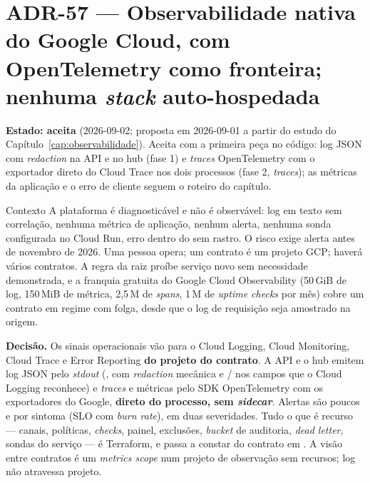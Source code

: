 \section{ADR-57 --- Observabilidade nativa do Google Cloud, com OpenTelemetry
como fronteira; nenhuma \emph{stack} auto-hospedada}
\label{adr:observabilidade-nativa}

\textbf{Estado: aceita} (2026-09-02; proposta em 2026-09-01 a partir do
estudo do Capítulo~\ref{cap:observabilidade}). Aceita com a primeira peça
no código: log JSON com \emph{redaction} na API e no hub (fase 1) e
\emph{traces} OpenTelemetry com o exportador direto do Cloud Trace nos dois
processos (fase 2, \emph{traces}); as métricas da aplicação e o erro de
cliente seguem o roteiro do capítulo.

\begin{especificacao}{Contexto}
A plataforma é diagnosticável e não é observável: log em texto sem
correlação, nenhuma métrica de aplicação, nenhum alerta, nenhuma sonda
configurada no Cloud Run, erro dentro do  sem rastro. O risco
 exige alerta antes de novembro de 2026. Uma pessoa opera; um
contrato é um projeto GCP; haverá vários contratos. A regra da raiz proíbe
serviço novo sem necessidade demonstrada, e a franquia gratuita do Google
Cloud Observability (50\,GiB de log, 150\,MiB de métrica, 2,5\,M de
\emph{spans}, 1\,M de \emph{uptime checks} por mês) cobre um contrato em
regime com folga, desde que o log de requisição seja amostrado na origem.
\end{especificacao}

\textbf{Decisão.} Os sinais operacionais vão para o Cloud Logging, Cloud
Monitoring, Cloud Trace e Error Reporting \textbf{do projeto do contrato}.
A API e o hub emitem log JSON pelo \emph{stdout} (, com
\emph{redaction} mecânica e / nos campos que o Cloud
Logging reconhece) e \emph{traces} e métricas pelo SDK OpenTelemetry com os
exportadores do Google, \textbf{direto do processo, sem \emph{sidecar}}.
Alertas são poucos e por sintoma (SLO com \emph{burn rate}), em duas
severidades. Tudo o que é recurso --- canais, políticas, \emph{checks},
painel, exclusões, \emph{bucket} de auditoria, \emph{dead letter}, sondas do
serviço --- é Terraform, e passa a constar do contrato em
. A visão entre contratos é um \emph{metrics scope}
num projeto de observação sem recursos; log não atravessa projeto.


